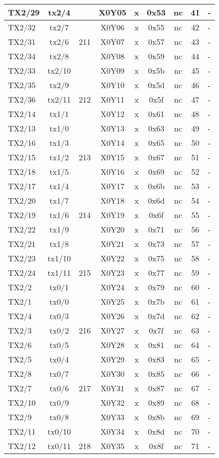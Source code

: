 \begin{longtable}{|l|c|c|c|c|c|c|c|l|}
TX2/29 & tx2/4  &     & X0Y05 &  x  & 0x53 & nc & 41 & -\\\hline
TX2/32 & tx2/7  &     & X0Y06 &  x  & 0x55 & nc & 42 & -\\\hline
TX2/31 & tx2/6  & 211 & X0Y07 &  x  & 0x57 & nc & 43 & -\\\hline
TX2/34 & tx2/8  &     & X0Y08 &  x  & 0x59 & nc & 44 & -\\\hline
TX2/33 & tx2/10 &     & X0Y09 &  x  & 0x5b & nc & 45 & -\\\hline
TX2/35 & tx2/9  &     & X0Y10 &  x  & 0x5d & nc & 46 & -\\\hline
TX2/36 & tx2/11 & 212 & X0Y11 &  x  & 0x5f & nc & 47 & -\\\hline
TX2/14 & tx1/1  &     & X0Y12 &  x  & 0x61 & nc & 48 & -\\\hline
TX2/13 & tx1/0  &     & X0Y13 &  x  & 0x63 & nc & 49 & -\\\hline
TX2/16 & tx1/3  &     & X0Y14 &  x  & 0x65 & nc & 50 & -\\\hline
TX2/15 & tx1/2  & 213 & X0Y15 &  x  & 0x67 & nc & 51 & -\\\hline
TX2/18 & tx1/5  &     & X0Y16 &  x  & 0x69 & nc & 52 & -\\\hline
TX2/17 & tx1/4  &     & X0Y17 &  x  & 0x6b & nc & 53 & -\\\hline
TX2/20 & tx1/7  &     & X0Y18 &  x  & 0x6d & nc & 54 & -\\\hline
TX2/19 & tx1/6  & 214 & X0Y19 &  x  & 0x6f & nc & 55 & -\\\hline
TX2/22 & tx1/9  &     & X0Y20 &  x  & 0x71 & nc & 56 & -\\\hline
TX2/21 & tx1/8  &     & X0Y21 &  x  & 0x73 & nc & 57 & -\\\hline
TX2/23 & tx1/10 &     & X0Y22 &  x  & 0x75 & nc & 58 & -\\\hline
TX2/24 & tx1/11 & 215 & X0Y23 &  x  & 0x77 & nc & 59 & -\\\hline
TX2/2  & tx0/1  &     & X0Y24 &  x  & 0x79 & nc & 60 & -\\\hline
TX2/1  & tx0/0  &     & X0Y25 &  x  & 0x7b & nc & 61 & -\\\hline
TX2/4  & tx0/3  &     & X0Y26 &  x  & 0x7d & nc & 62 & -\\\hline
TX2/3  & tx0/2  & 216 & X0Y27 &  x  & 0x7f & nc & 63 & -\\\hline
TX2/6  & tx0/5  &     & X0Y28 &  x  & 0x81 & nc & 64 & -\\\hline
TX2/5  & tx0/4  &     & X0Y29 &  x  & 0x83 & nc & 65 & -\\\hline
TX2/8  & tx0/7  &     & X0Y30 &  x  & 0x85 & nc & 66 & -\\\hline
TX2/7  & tx0/6  & 217 & X0Y31 &  x  & 0x87 & nc & 67 & -\\\hline
TX2/10 & tx0/9  &     & X0Y32 &  x  & 0x89 & nc & 68 & -\\\hline
TX2/9  & tx0/8  &     & X0Y33 &  x  & 0x8b & nc & 69 & -\\\hline
TX2/11 & tx0/10 &     & X0Y34 &  x  & 0x8d & nc & 70 & -\\\hline
TX2/12 & tx0/11 & 218 & X0Y35 &  x  & 0x8f & nc & 71 & -\\\hline
\end{longtable}


